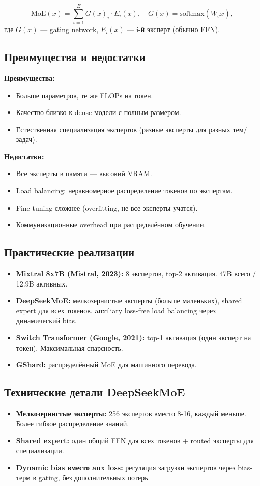 \documentclass[a4paper,12pt]{article}
\begin{document}
\[
\text{MoE}(x) = \sum_{i=1}^E G(x)_i \cdot E_i(x), \quad G(x) = \text{softmax}(W_g x),
\]
где $G(x)$ --- gating network, $E_i(x)$ --- i-й эксперт (обычно FFN).

\subsection{Преимущества и недостатки}

\textbf{Преимущества:}
\begin{itemize}
    \item Больше параметров, те же FLOPs на токен.
    \item Качество близко к dense-модели с полным размером.
    \item Естественная специализация экспертов (разные эксперты для разных тем/задач).
\end{itemize}

\textbf{Недостатки:}
\begin{itemize}
    \item Все эксперты в памяти --- высокий VRAM.
    \item Load balancing: неравномерное распределение токенов по экспертам.
    \item Fine-tuning сложнее (overfitting, не все эксперты учатся).
    \item Коммуникационные overhead при распределённом обучении.
\end{itemize}

\subsection{Практические реализации}

\begin{itemize}
    \item \textbf{Mixtral 8x7B (Mistral, 2023):} 8 экспертов, top-2 активация. 47B всего / 12.9B активных.
    \item \textbf{DeepSeekMoE:} мелкозернистые эксперты (больше маленьких), shared expert для всех токенов, auxiliary loss-free load balancing через динамический bias.
    \item \textbf{Switch Transformer (Google, 2021):} top-1 активация (один эксперт на токен). Максимальная спарсность.
    \item \textbf{GShard:} распределённый MoE для машинного перевода.
\end{itemize}

\subsection{Технические детали DeepSeekMoE}
\begin{itemize}
    \item \textbf{Мелкозернистые эксперты:} 256 экспертов вместо 8-16, каждый меньше. Более гибкое распределение знаний.
    \item \textbf{Shared expert:} один общий FFN для всех токенов + routed эксперты для специализации.
    \item \textbf{Dynamic bias вместо aux loss:} регуляция загрузки экспертов через bias-терм в gating, без дополнительных потерь.
\end{itemize}
\end{document}

